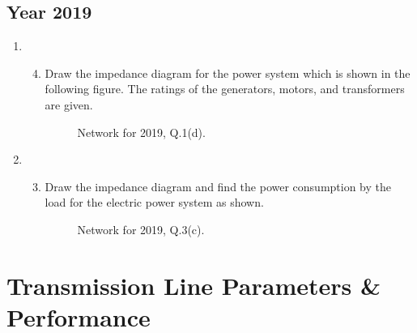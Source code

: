 \documentclass[12pt, a4paper]{article}
\begin{document}
	\subsection{Year 2019}
	\begin{enumerate}[label=\textbf{Q\arabic*.}, wide, labelindent=0pt]
		\item 
		\begin{enumerate}[label=\textbf{(\alph*)}]
			\setcounter{enumii}{3} %
			\item Draw the impedance diagram for the power system which is shown in the following figure. The ratings of the generators, motors, and transformers are given.
			\begin{figure}[h!]
				\centering
				\caption{Network for 2019, Q.1(d).}
			\end{figure}
		\end{enumerate}
		\item 
		\begin{enumerate}[label=\textbf{(\alph*)}]
			\setcounter{enumii}{2} %
			\item Draw the impedance diagram and find the power consumption by the load for the electric power system as shown.
			\begin{figure}[h!]
				\centering
				\caption{Network for 2019, Q.3(c).}
			\end{figure}
		\end{enumerate}
	\end{enumerate}
	
	\section{Transmission Line Parameters \& Performance}
	
\end{document}
